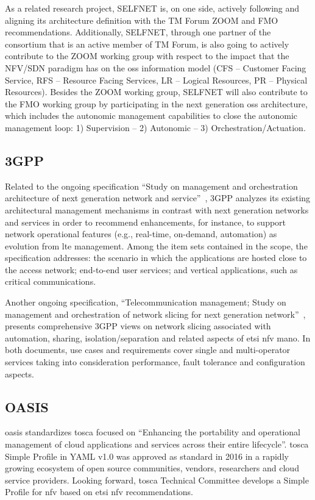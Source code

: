 As a related research project, SELFNET is, on one side, actively following and aligning its architecture definition with the TM Forum ZOOM and FMO recommendations. Additionally, SELFNET, through one partner of the consortium that is an active member of TM Forum, is also going to actively contribute to the ZOOM working group with respect to the impact that the NFV/SDN paradigm has on the \gls{oss} information model (CFS – Customer Facing Service, RFS – Resource Facing Services, LR – Logical Resources, PR – Physical Resources). Besides the ZOOM working group, SELFNET will also contribute to the FMO working group by participating in the next generation \gls{oss} architecture, which includes the autonomic management capabilities to close the autonomic management loop: 1) Supervision – 2) Autonomic – 3) Orchestration/Actuation.

\subsection{3GPP}
Related to the ongoing specification ``Study on management and orchestration architecture of next generation network and service''~\cite{3gppStudy:28800:2017}, 3GPP analyzes its existing architectural management mechanisms in contrast with next generation networks and services in order to recommend enhancements, for instance, to support network operational features (e.g., real-time, on-demand, automation) as evolution from \gls{lte} management. Among the item sets contained in the scope, the specification addresses: the scenario in which the applications are hosted close to the access network; end-to-end user services; and vertical applications, such as critical communications. 

Another ongoing specification, ``Telecommunication management; Study on management and orchestration of network slicing for next generation network''~\cite{3GPP2017TRNetwork}, presents comprehensive 3GPP views on network slicing associated with automation, sharing, isolation/separation and related aspects of \gls{etsi} \gls{nfv} \gls{mano}. In both documents, use cases and requirements cover single and multi-operator services taking into consideration performance, fault tolerance and configuration aspects.

\subsection{OASIS}
\gls{oasis} standardizes \gls{tosca} focused on ``Enhancing the portability and operational management of cloud applications and services across their entire lifecycle''. \gls{tosca} Simple Profile in YAML v1.0 was approved as standard in 2016 in a rapidly growing ecosystem of open source communities, vendors, researchers and cloud service providers. Looking forward, \gls{tosca} Technical Committee develops a Simple Profile for \gls{nfv} based on \gls{etsi} \gls{nfv} recommendations. 


